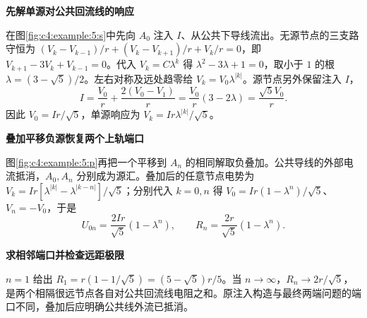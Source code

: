 \begin{solution}\textbf{先解单源对公共回流线的响应}\par\nobreak
在图\ref{fig:c4:example:5:s}中先向 $A_0$ 注入 $I$、从公共下导线流出。无源节点的三支路守恒为 $(V_k-V_{k-1})/r+(V_k-V_{k+1})/r+V_k/r=0$，即 $V_{k+1}-3V_k+V_{k-1}=0$。代入 $V_k=C\lambda^k$ 得 $\lambda^2-3\lambda+1=0$，取小于 $1$ 的根 $\lambda=(3-\sqrt5)/2$。左右对称及远处趋零给 $V_k=V_0\lambda^{|k|}$。源节点另外保留注入 $I$，
\[
 I=\frac{V_0}{r}+\frac{2(V_0-V_1)}r
 =\frac{V_0}{r}(3-2\lambda)=\frac{\sqrt5V_0}{r}.
\]
因此 $V_0=Ir/\sqrt5$，单源响应为 $V_k=Ir\lambda^{|k|}/\sqrt5$。



\par\medskip{}\noindent\textbf{叠加平移负源恢复两个上轨端口}\par\nobreak
图\ref{fig:c4:example:5:p}再把一个平移到 $A_n$ 的相同解取负叠加。公共导线的外部电流抵消，$A_0,A_n$ 分别成为源汇。叠加后的任意节点电势为 $V_k=Ir[\lambda^{|k|}-\lambda^{|k-n|}]/\sqrt5$；分别代入 $k=0,n$ 得 $V_0=Ir(1-\lambda^n)/\sqrt5$、$V_n=-V_0$，于是
\[
 U_{0n}=\frac{2Ir}{\sqrt5}(1-\lambda^n),\qquad
 R_n=\frac{2r}{\sqrt5}(1-\lambda^n).
\]


\par\medskip{}\noindent\textbf{求相邻端口并检查远距极限}\par\nobreak
$n=1$ 给出 $R_1=r(1-1/\sqrt5)=(5-\sqrt5)r/5$。当 $n\to\infty$，$R_n\to2r/\sqrt5$，是两个相隔很远节点各自对公共回流线电阻之和。原注入构造与最终两端问题的端口不同，叠加后应明确公共线外流已抵消。\end{solution}
